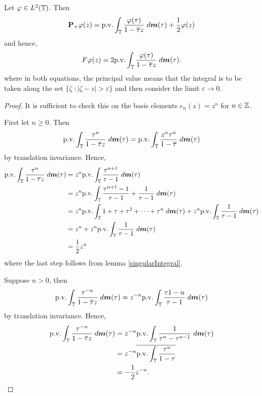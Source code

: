 \begin{theorem}
    Let $\varphi \in L^2(\mathbb{T})$. Then
    \begin{equation*}
        \mathbf{P}_+\varphi(z) = \mathrm{p.v.}\int_{\mathbb{T}} \frac{\varphi(\tau)}{1-\overline{\tau}z}\;d\boldsymbol{m}(\tau)+\frac{1}{2}\varphi(z)
    \end{equation*}
    and hence,
    \begin{equation*}
        F\varphi(z) = 2\mathrm{p.v.}\int_{\mathbb{T}} \frac{\varphi(\tau)}{1-\overline{\tau}z}\;d\boldsymbol{m}(\tau).
    \end{equation*}
    where in both equations, the principal value means that the integral is to be taken along the set $\{ \zeta\;:|\zeta-z| > \varepsilon\}$
    and then consider the limit $\varepsilon\rightarrow 0$.
\end{theorem}
\begin{proof}
    It is sufficient to check this on the basis elements $e_n(z) = z^n$ for $n \in \mathbb{Z}$.
    
    First let $n \geq 0$. Then
    \begin{equation*}
        \mathrm{p.v.}\int_{\mathbb{T}} \frac{\tau^n}{1-\overline{\tau}z}\;d\boldsymbol{m}(\tau) = \mathrm{p.v.}\int_{\mathbb{T}} \frac{z^n\tau^n}{1-\overline{\tau}}\;d\boldsymbol{m}(\tau)
    \end{equation*}
    by translation invariance.
    Hence,
    \begin{align*}
        \mathrm{p.v.}\int_{\mathbb{T}} \frac{\tau^n}{1-\overline{\tau}z}\;d\boldsymbol{m}(\tau) &= z^n\mathrm{p.v.}\int_{\mathbb{T}} \frac{\tau^{n+1}}{\tau-1}\;d\boldsymbol{m}(\tau) \\
        &= z^n \mathrm{p.v.}\int_{\mathbb{T}} \frac{\tau^{n+1}-1}{\tau-1}+\frac{1}{\tau-1}\;d\boldsymbol{m}(\tau)\\
        &= z^n \mathrm{p.v.}\int_{\mathbb{T}} 1+\tau+\tau^2+\cdots+\tau^{n}\;d\boldsymbol{m}(\tau)+z^n\mathrm{p.v.}\int_{\mathbb{T}} \frac{1}{\tau-1}\;d\boldsymbol{m}(\tau)\\
        &= z^n + z^n\mathrm{p.v.}\int_{\mathbb{T}} \frac{1}{\tau-1}\;d\boldsymbol{m}(\tau)\\
        &= \frac{1}{2}z^n
    \end{align*}
    where the last step follows from lemma \ref{singularIntegral}.
    
    Suppose $n > 0$, then
    \begin{equation*}
        \mathrm{p.v.}\int_{\mathbb{T}} \frac{\tau^{-n}}{1-\overline{\tau}z}\;d\boldsymbol{m}(\tau) = z^{-n} \mathrm{p.v.}\int_{\mathbb{T}} \frac{\tau{1-n}}{\tau-1}\;d\boldsymbol{m}(\tau)
    \end{equation*}
    by translation invariance. Hence,
    \begin{align*}
        \mathrm{p.v.}\int_{\mathbb{T}} \frac{\tau^{-n}}{1-\overline{\tau}z}\;d\boldsymbol{m}(\tau) &= z^{-n} \mathrm{p.v.} \int_{\mathbb{T}} \frac{1}{\tau^n-\tau^{n-1}}\;d\boldsymbol{m}(\tau)\\
        &= z^{-n}\overline{\mathrm{p.v.}\int_{\mathbb{T}} \frac{\tau^n}{1-\tau}}\\
        &= -\frac{1}{2}z^{-n}.
    \end{align*}
    

\end{proof}
